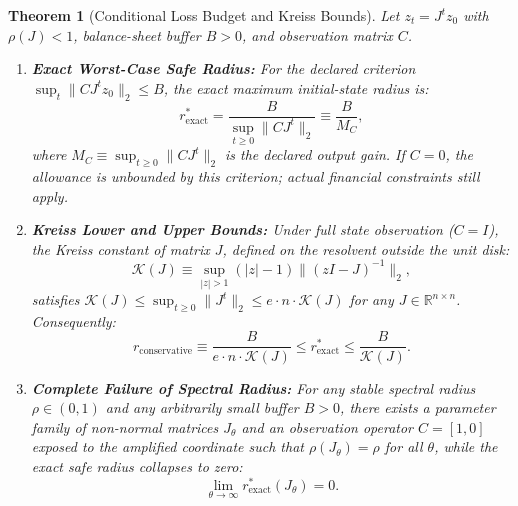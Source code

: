 \documentclass[12pt]{article}
\newtheorem{theorem}{Theorem}[section]
\theoremstyle{definition}
\theoremstyle{remark}
\newcommand{\R}{\mathbb{R}}
\begin{document}
\begin{theorem}[Conditional Loss Budget and Kreiss Bounds]
\label{thm:m5_kreiss_solvency}
Let $z_t = J^t z_0$ with $\rho(J) < 1$, balance-sheet buffer $B > 0$, and observation matrix $C$.
\begin{enumerate}
    \item \textbf{Exact Worst-Case Safe Radius:} For the declared criterion $\sup_t\|CJ^tz_0\|_2\le B$, the exact maximum initial-state radius is:
    \begin{equation}
    r^*_{\text{exact}} = \frac{B}{\sup_{t \ge 0} \|C J^t\|_2} \equiv \frac{B}{M_C},
    \label{eq:exact_safe_radius}
    \end{equation}
    where $M_C \equiv \sup_{t \ge 0} \|C J^t\|_2$ is the declared output gain. If $C=0$, the allowance is unbounded by this criterion; actual financial constraints still apply.
    \item \textbf{Kreiss Lower and Upper Bounds:} Under full state observation ($C = I$), the Kreiss constant of matrix $J$, defined on the resolvent outside the unit disk:
    \begin{equation}
    \mathcal{K}(J) \equiv \sup_{|z| > 1} (|z| - 1) \|(zI - J)^{-1}\|_2,
    \label{eq:kreiss_def}
    \end{equation}
    satisfies $\mathcal{K}(J) \le \sup_{t \ge 0} \|J^t\|_2 \le e \cdot n \cdot \mathcal{K}(J)$ for any $J \in \R^{n \times n}$. Consequently:
    \begin{equation}
    r_{\text{conservative}} \equiv \frac{B}{e \cdot n \cdot \mathcal{K}(J)} \le r^*_{\text{exact}} \le \frac{B}{\mathcal{K}(J)}.
    \label{eq:kreiss_bilateral_bound}
    \end{equation}
    \item \textbf{Complete Failure of Spectral Radius:} For any stable spectral radius $\rho \in (0, 1)$ and any arbitrarily small buffer $B > 0$, there exists a parameter family of non-normal matrices $J_\theta$ and an observation operator $C = [1, 0]$ exposed to the amplified coordinate such that $\rho(J_\theta) = \rho$ for all $\theta$, while the exact safe radius collapses to zero:
    \begin{equation}
    \lim_{\theta \to \infty} r^*_{\text{exact}}(J_\theta) = 0.
    \end{equation}
\end{enumerate}
\end{theorem}
\end{document}

